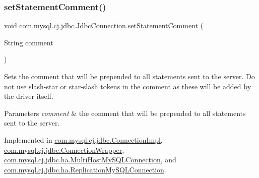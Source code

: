 \mbox{\label{interfacecom_1_1mysql_1_1cj_1_1jdbc_1_1_jdbc_connection_adfbd59fbebd013673ed3eb97beb76179}} 
\subsubsection{\texorpdfstring{set\+Statement\+Comment()}{setStatementComment()}}
{\footnotesize\ttfamily void com.\+mysql.\+cj.\+jdbc.\+Jdbc\+Connection.\+set\+Statement\+Comment (\begin{DoxyParamCaption}\item[{String}]{comment }\end{DoxyParamCaption})}

Sets the comment that will be prepended to all statements sent to the server. Do not use slash-\/star or star-\/slash tokens in the comment as these will be added by the driver itself.


\begin{DoxyParams}{Parameters}
{\em comment} & the comment that will be prepended to all statements sent to the server. \\
\hline
\end{DoxyParams}


Implemented in \mbox{\hyperlink{classcom_1_1mysql_1_1cj_1_1jdbc_1_1_connection_impl_ae62d28e9ed05949b66aa0ea00633d51d}{com.\+mysql.\+cj.\+jdbc.\+Connection\+Impl}}, \mbox{\hyperlink{classcom_1_1mysql_1_1cj_1_1jdbc_1_1_connection_wrapper_a79c9fe73cc7069028015a7e3e6a383fb}{com.\+mysql.\+cj.\+jdbc.\+Connection\+Wrapper}}, \mbox{\hyperlink{classcom_1_1mysql_1_1cj_1_1jdbc_1_1ha_1_1_multi_host_my_s_q_l_connection_a4e028eb0c700613a20c0a2b7f8a21170}{com.\+mysql.\+cj.\+jdbc.\+ha.\+Multi\+Host\+My\+S\+Q\+L\+Connection}}, and \mbox{\hyperlink{classcom_1_1mysql_1_1cj_1_1jdbc_1_1ha_1_1_replication_my_s_q_l_connection_a7afc9e0c6196c0acd9f60ca99c5e7b8a}{com.\+mysql.\+cj.\+jdbc.\+ha.\+Replication\+My\+S\+Q\+L\+Connection}}.

\mbox{\label{interfacecom_1_1mysql_1_1cj_1_1jdbc_1_1_jdbc_connection_ad9bedf228ed2ec194197ac2ceb960a94}} 
